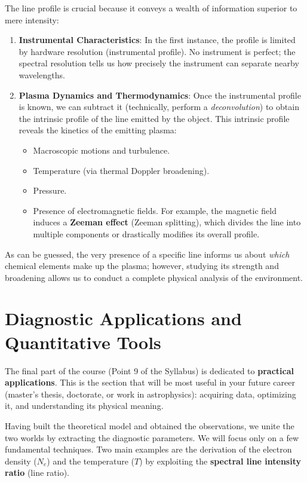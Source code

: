 The line profile is crucial because it conveys a wealth of information superior to mere intensity:
\begin{enumerate}
    \item \textbf{Instrumental Characteristics}: In the first instance, the profile is limited by hardware resolution (instrumental profile). No instrument is perfect; the spectral resolution tells us how precisely the instrument can separate nearby wavelengths.
    \item \textbf{Plasma Dynamics and Thermodynamics}: Once the instrumental profile is known, we can subtract it (technically, perform a \textit{deconvolution}) to obtain the intrinsic profile of the line emitted by the object. This intrinsic profile reveals the kinetics of the emitting plasma:
    \begin{itemize}
        \item Macroscopic motions and turbulence.
        \item Temperature (via thermal Doppler broadening).
        \item Pressure.
        \item Presence of electromagnetic fields. For example, the magnetic field induces a \textbf{Zeeman effect} (Zeeman splitting), which divides the line into multiple components or drastically modifies its overall profile.
    \end{itemize}
\end{enumerate}

As can be guessed, the very presence of a specific line informs us about \textit{which} chemical elements make up the plasma; however, studying its strength and broadening allows us to conduct a complete physical analysis of the environment.

\section{Diagnostic Applications and Quantitative Tools}

The final part of the course (Point 9 of the Syllabus) is dedicated to \textbf{practical applications}. This is the section that will be most useful in your future career (master's thesis, doctorate, or work in astrophysics): acquiring data, optimizing it, and understanding its physical meaning.

Having built the theoretical model and obtained the observations, we unite the two worlds by extracting the diagnostic parameters. We will focus only on a few fundamental techniques. Two main examples are the derivation of the electron density ($N_e$) and the temperature ($T$) by exploiting the \textbf{spectral line intensity ratio} (line ratio).

